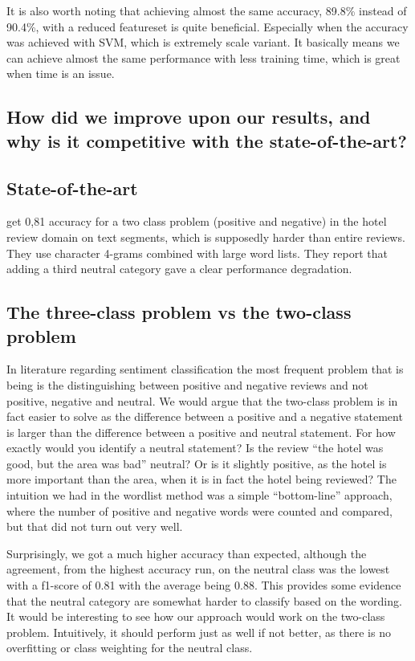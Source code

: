 \documentclass{article}
\begin{document}
It is also worth noting that achieving almost the same accuracy, 89.8\% instead of 90.4\%, with a reduced featureset is quite beneficial. Especially when the accuracy was achieved with SVM, which is extremely scale variant. It basically means we can achieve almost the same performance with less training time, which is great when time is an issue. 

\subsection{How did we improve upon our results, and why is it competitive with the state-of-the-art?}

\subsection{State-of-the-art}
\cite{kasper2011sentiment} get 0,81 accuracy for a two class problem (positive and negative) in the hotel review domain on text segments, which is supposedly harder than entire reviews.  They use character 4-grams combined with large word lists. They report that adding a third neutral category gave a clear performance degradation. 

\subsection{The three-class problem vs the two-class problem}
In literature regarding sentiment classification the most frequent problem that is being is the distinguishing between positive and negative reviews and not positive, negative and neutral. We would argue that the two-class problem is in fact easier to solve as the difference between a positive and a negative statement is larger than the difference between a positive and neutral statement. For how exactly would you identify a neutral statement? Is the review “the hotel was good, but the area was bad” neutral? Or is it slightly positive, as the hotel is more important than the area, when it is in fact the hotel being reviewed? The intuition we had in the wordlist method was a simple “bottom-line” approach, where the number of positive and negative words were counted and compared, but that did not turn out very well. 

Surprisingly, we got a much higher accuracy than expected, although the agreement, from the highest accuracy run, on the neutral class was the lowest with a f1-score of 0.81 with the average being 0.88. This provides some evidence that the neutral category are somewhat harder to classify based on the wording. It would be interesting to see how our approach would work on the two-class problem. Intuitively, it should perform just as well if not better, as there is no overfitting or class weighting  for the neutral class.
\end{document}
